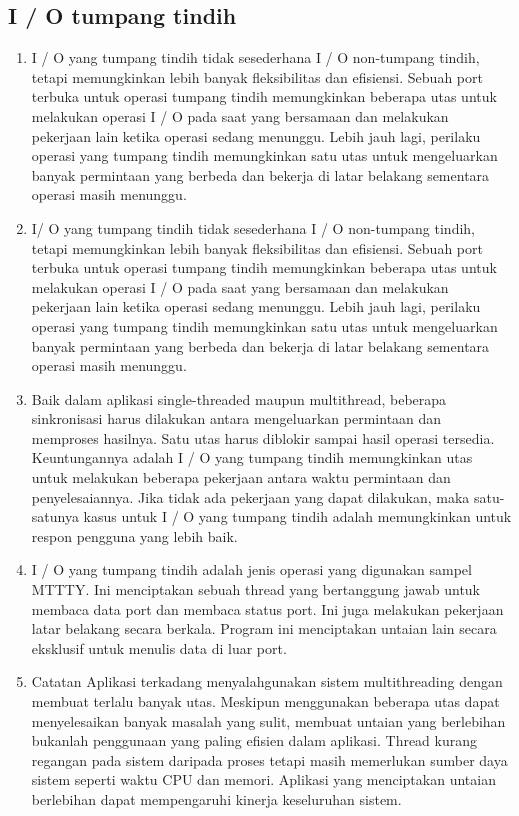 		\subsection{I / O tumpang tindih}
		\begin{enumerate}
		

				]\item I / O yang tumpang tindih tidak sesederhana I / O non-tumpang tindih, tetapi memungkinkan lebih banyak fleksibilitas dan efisiensi. Sebuah port terbuka untuk operasi tumpang tindih memungkinkan beberapa utas untuk melakukan operasi I / O pada saat yang bersamaan dan melakukan pekerjaan lain ketika operasi sedang menunggu. Lebih jauh lagi, perilaku operasi yang tumpang tindih memungkinkan satu utas untuk mengeluarkan banyak permintaan yang berbeda dan bekerja di latar belakang sementara operasi masih menunggu.

				\item I/ O yang tumpang tindih tidak sesederhana I / O non-tumpang tindih, tetapi memungkinkan lebih banyak fleksibilitas dan efisiensi. Sebuah port terbuka untuk operasi tumpang tindih memungkinkan beberapa utas untuk melakukan operasi I / O pada saat yang bersamaan dan melakukan pekerjaan lain ketika operasi sedang menunggu. Lebih jauh lagi, perilaku operasi yang tumpang tindih memungkinkan satu utas untuk mengeluarkan banyak permintaan yang berbeda dan bekerja di latar belakang sementara operasi masih menunggu.


				\item Baik dalam aplikasi single-threaded maupun multithread, beberapa sinkronisasi harus dilakukan antara mengeluarkan permintaan dan memproses hasilnya. Satu utas harus diblokir sampai hasil operasi tersedia. Keuntungannya adalah I / O yang tumpang tindih memungkinkan utas untuk melakukan beberapa pekerjaan antara waktu permintaan dan penyelesaiannya. Jika tidak ada pekerjaan yang dapat dilakukan, maka satu-satunya kasus untuk I / O yang tumpang tindih adalah memungkinkan untuk respon pengguna yang lebih baik.

				\item I / O yang tumpang tindih adalah jenis operasi yang digunakan sampel MTTTY. Ini menciptakan sebuah thread yang bertanggung jawab untuk membaca data port dan membaca status port. Ini juga melakukan pekerjaan latar belakang secara berkala. Program ini menciptakan untaian lain secara eksklusif untuk menulis data di luar port.
				
				\item Catatan Aplikasi terkadang menyalahgunakan sistem multithreading dengan membuat terlalu banyak utas. Meskipun menggunakan beberapa utas dapat menyelesaikan banyak masalah yang sulit, membuat untaian yang berlebihan bukanlah penggunaan yang paling efisien dalam aplikasi. Thread kurang regangan pada sistem daripada proses tetapi masih memerlukan sumber daya sistem seperti waktu CPU dan memori. Aplikasi yang menciptakan untaian berlebihan dapat mempengaruhi kinerja keseluruhan sistem.

		\end{enumerate}

